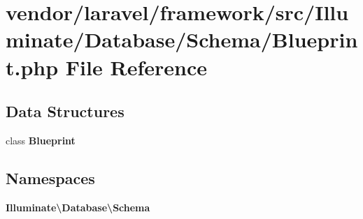 \section{vendor/laravel/framework/src/\+Illuminate/\+Database/\+Schema/\+Blueprint.php File Reference}
\label{_blueprint_8php}
\subsection*{Data Structures}
\begin{DoxyCompactItemize}
\item 
class {\bf Blueprint}
\end{DoxyCompactItemize}
\subsection*{Namespaces}
\begin{DoxyCompactItemize}
\item 
 {\bf Illuminate\textbackslash{}\+Database\textbackslash{}\+Schema}
\end{DoxyCompactItemize}
